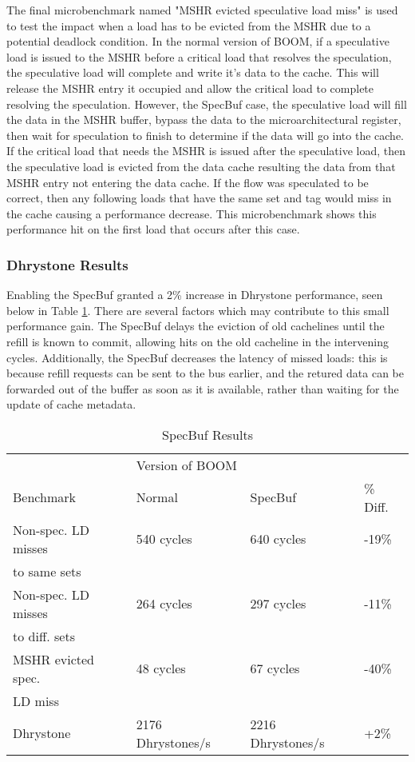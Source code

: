 The final microbenchmark named "MSHR evicted speculative load miss" is used to test the impact when a load has to be evicted from the 
MSHR due to a potential deadlock condition. In the normal version of BOOM, if a speculative load is issued to the 
MSHR before a critical load that resolves the speculation, the speculative load will complete and
write it's data to the cache. This will release the MSHR entry it occupied and allow the critical load to complete resolving the speculation. 
However, the SpecBuf case, the speculative load will fill the data in the MSHR buffer, bypass the data to the microarchitectural register, 
then wait for speculation to finish to determine if the data will go into the cache. If the critical load that needs the MSHR is issued after the speculative load,
then the speculative load is evicted from the data cache resulting the data from that MSHR entry not entering the data cache. If the 
flow was speculated to be correct, then any following loads that have the same set and tag would miss in the cache causing a performance decrease.
This microbenchmark shows this performance hit on the first load that occurs after this case.

\subsubsection{Dhrystone Results}
Enabling the SpecBuf granted a 2\% increase in Dhrystone performance, seen below in Table \ref{tab:spec-buf-results}. There are several factors which may contribute to this small performance gain. The SpecBuf delays the eviction of old cachelines until the refill is known to commit, allowing hits on the old cacheline in the intervening cycles. Additionally, the SpecBuf decreases the latency of missed loads: this is because refill requests can be sent to the bus earlier, and the retured data can be forwarded out of the buffer as soon as it is available, rather than waiting for the update of cache metadata.

\begin{table}
\centering
\caption{SpecBuf Results}
\label{tab:spec-buf-results}
\begin{tabular}{@{} *4l @{}} \toprule
    & \multicolumn{2}{l}{Version of BOOM} & \\
    Benchmark                           & Normal & SpecBuf & \% Diff.\\ \midrule
    Non-spec. LD misses   & 540 cycles & 640 cycles & -19\%    \\
    to same sets            &            &            & \\ \midrule
    Non-spec. LD misses   & 264 cycles & 297 cycles & -11\%    \\ 
    to diff. sets           &            &            & \\ \midrule
    MSHR evicted spec. & 48 cycles & 67 cycles & -40\%    \\
    LD miss                &            &            & \\ \midrule
    Dhrystone                           & 2176 Dhrystones/s & 2216 Dhrystones/s & +2\%\\ \bottomrule
\end{tabular}
\end{table}

